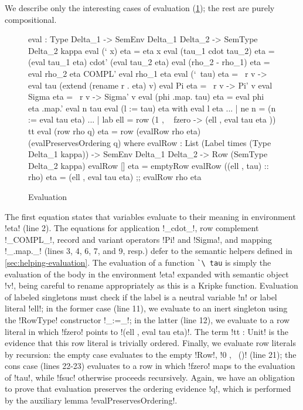 \documentclass[sigplan,10pt,anonymous,review]{acmart}\settopmatter{printfolios=true,printccs=false,printacmref=false}
\begin{document}
We describe only the interesting cases of evaluation (\cref{fig:evaluation}); the rest are purely compositional. 

\begin{figure}
\begin{agda}
eval : Type Delta_1 -> SemEnv Delta_1  Delta_2 -> SemType Delta_2  kappa
eval (` x) eta = eta x
eval (tau_1  cdot  tau_2) eta = (eval tau_1  eta) cdot' (eval tau_2  eta)
eval (rho_2 - rho_1) eta = eval rho_2 eta COMPL' eval rho_1  eta 
eval (`\ tau) eta = \ r v -> 
  eval tau (extend (rename r . eta) v)
eval Pi eta = \ r v -> Pi' v
eval Sigma eta = \ r v -> Sigma' v
eval (phi .map. tau) eta = eval phi eta .map.' eval n tau
eval (l := tau) eta with eval l eta 
... | ne n = (n := eval tau eta)
... | lab ell = row (1 , \ { 
        fzero -> (ell , eval tau eta )}) tt
eval (row rho q) eta = row 
  (evalRow rho eta) 
  (evalPreservesOrdering q)
where
  evalRow : List (Label times (Type Delta_1 kappa)) -> 
            SemEnv Delta_1  Delta_2 -> 
            Row (SemType Delta_2 kappa)
  evalRow [] eta = emptyRow
  evalRow ((ell , tau) :: rho) eta = 
    (ell , eval tau eta) ;; evalRow rho eta
\end{agda}
\caption{Evaluation}
\label{fig:evaluation}
\end{figure}

The first equation states that variables evaluate to their meaning in environment !eta! (line 2). The equations for application !_cdot_!, row complement !_COMPL_!, record and variant operators !Pi! and !Sigma!, and mapping !_.map._! (lines 3, 4, 6, 7, and 9, resp.) defer to the semantic helpers defined in \cref{sec:helping-evaluation}. The evaluation of a function \lstinline{`\ tau} is simply the evaluation of the body in the environment !eta! expanded with semantic object !v!, being careful to rename appropriately as this is a Kripke function. Evaluation of labeled singletons must check if the label is a neutral variable !n! or label literal !ell!; in the former case (line 11), we evaluate to an inert singleton using the !RowType! constructor !_:=_!; in the latter (line 12), we evaluate to a row literal in which !fzero! points to !(ell , eval tau eta)!. The term !tt : Unit! is the evidence that this row literal is trivially ordered. Finally, we evaluate row literals by recursion: the empty case evaluates to the empty !Row!, !0 , \ ()! (line 21); the cons case (lines 22-23) evaluates to a row in which !fzero! maps to the evaluation of !tau!, while !fsuc! otherwise proceeds recursively. Again, we have an obligation to prove that evaluation preserves the ordering evidence !q!, which is performed by the auxiliary lemma !evalPreservesOrdering!.
\end{document}

